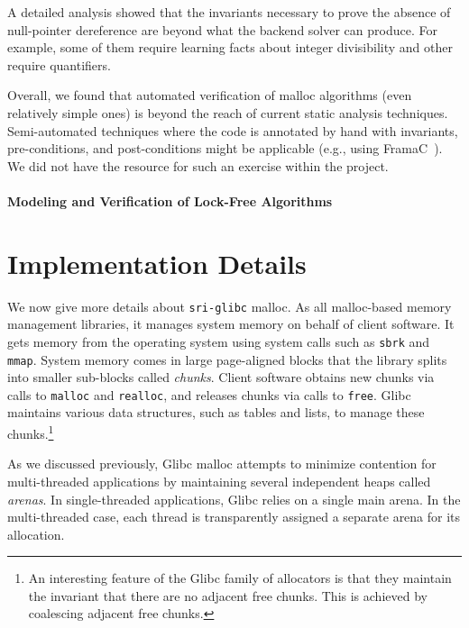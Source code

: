 \documentclass[12pt]{cslreport}
\begin{document}
A detailed analysis showed that the invariants necessary to prove the
absence of null-pointer dereference are beyond what the backend solver
can produce. For example, some of them require learning facts about
integer divisibility and other require quantifiers.

Overall, we found that automated verification of malloc algorithms
(even relatively simple ones) is beyond the reach of current static
analysis techniques. Semi-automated techniques where the code is
annotated by hand with invariants, pre-conditions, and post-conditions
might be applicable (e.g., using
FramaC~\cite{Kirchner+etal:FramaC:2015}). We did not have the resource
for such an exercise within the project.


\subsubsection{Modeling and Verification of Lock-Free Algorithms}





\chapter{Implementation Details}


We now give more details about \texttt{sri-glibc} malloc. As all
malloc-based memory management libraries, it manages system memory on
behalf of client software. It gets memory from the operating system
using system calls such as \texttt{sbrk} and \texttt{mmap}. System
memory comes in large page-aligned blocks that the library splits into
smaller sub-blocks called \emph{chunks}. Client software obtains new
chunks via calls to \texttt{malloc} and \texttt{realloc}, and releases
chunks via calls to \texttt{free}. Glibc maintains various data
structures, such as tables and lists, to manage these
chunks.\footnote{An interesting feature of the Glibc family of
  allocators is that they maintain the invariant that there are no
  adjacent free chunks. This is achieved by coalescing adjacent free
  chunks.}

As we discussed previously, Glibc malloc attempts to minimize
contention for multi-threaded applications by maintaining several
independent heaps called \emph{arenas}. In single-threaded
applications, Glibc relies on a single main arena. In the
multi-threaded case, each thread is transparently assigned a separate
arena for its allocation.
\end{document}
